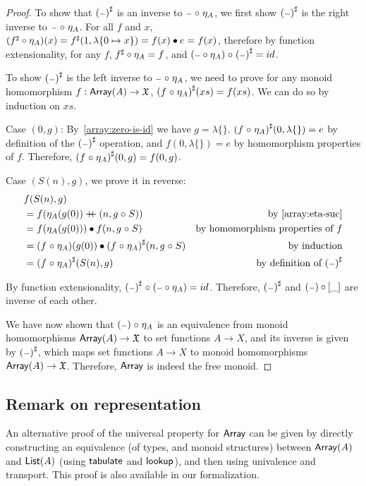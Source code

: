 \begin{proof}
    To show that ${({\scriptstyle{-}})}^{\sharp}$ is an inverse to ${\scriptstyle{-}} \mathrel{\circ} \eta_A$,
    we first show ${({\scriptstyle{-}})}^{\sharp}$ is the right inverse to ${\scriptstyle{-}} \mathrel{\circ} \eta_A$.
    For all $f$ and $x$, $({f}^{\sharp} \circ \eta_A)(x) = {f}^{\sharp}(1, \lambda\{0 \mapsto x\}) = f(x) \mathbin{\bullet} e = f(x)$,
    therefore by function extensionality, for any $f$, ${f}^{\sharp} \circ \eta_A = f$,
    and $({\scriptstyle{-}} \circ \eta_A) \mathrel{\circ} {({\scriptstyle{-}})}^{\sharp} = id$.

    To show ${({\scriptstyle{-}})}^{\sharp}$ is the left inverse to ${\scriptstyle{-}} \mathrel{\circ} \eta_A$, we need to prove
    for any monoid homomorphism $f : \operatorname{\mathsf{Array}}(A) \to \mathfrak{X}$, ${(f \mathrel{\circ} \eta_A)}^{\sharp}(xs) = f(xs)$.
    We can do so by induction on $xs$.

    Case $(0, g)$:
    By~\cref{array:zero-is-id} we have $g = \lambda\{\}$.
    ${(f \mathrel{\circ} \eta_A)}^{\sharp}(0, \lambda\{\}) = e$ by definition of the ${({\scriptstyle{-}})}^{\sharp}$ operation,
    and $f(0, \lambda\{\}) = e$ by homomorphism properties of $f$.
    Therefore, ${(f \mathrel{\circ} \eta_A)}^{\sharp}(0, g) = f(0, g)$.

    Case $(S(n), g)$, we prove it in reverse:
    \begin{align*}
         & f(S(n), g)                                                                                                     \\
         & = f(\eta_A(g(0)) \doubleplus (n, g \comp S))                        & \text{by~\cref{array:eta-suc}}            \\
         & = f(\eta_A(g(0))) \mult f(n, g \comp S)                             & \text{by homomorphism properties of $f$} \\
         & = (f \comp \eta_A)(g(0)) \mult \ext{(f \comp \eta_A)}(n, g \comp S) & \text{by induction}                      \\
         & = \ext{(f \comp \eta_A)}(S(n), g)                                   & \text{by definition of $\ext{(\blank)}$}
    \end{align*}

    By function extensionality, ${({\scriptstyle{-}})}^{\sharp} \mathrel{\circ} ({\scriptstyle{-}} \circ \eta_A) = id$.
    Therefore, ${({\scriptstyle{-}})}^{\sharp}$ and $({\scriptstyle{-}}) \circ [\_]$ are inverse of each other.

    We have now shown that $({\scriptstyle{-}}) \mathrel{\circ} \eta_A$ is an equivalence from
    monoid homomorphisms $\operatorname{\mathsf{Array}}(A) \to \mathfrak{X}$
    to set functions $A \to X$, and its inverse is given by ${({\scriptstyle{-}})}^{\sharp}$, which maps set
    functions $A \to X$ to monoid homomorphisms $\operatorname{\mathsf{Array}}(A) \to \mathfrak{X}$. Therefore, $\operatorname{\mathsf{Array}}$ is indeed
    the free monoid.

\end{proof}

\subsection{Remark on representation}
An alternative proof of the universal property for $\operatorname{\mathsf{Array}}$ can be given by directly constructing an equivalence (of
types, and monoid structures) between $\operatorname{\mathsf{Array}}(A)$ and $\operatorname{\mathsf{List}}(A)$ (using $\operatorname{\mathsf{tabulate}}$ and $\operatorname{\mathsf{lookup}}$), and then
using univalence and transport.
%
This proof is also available in our formalization.
